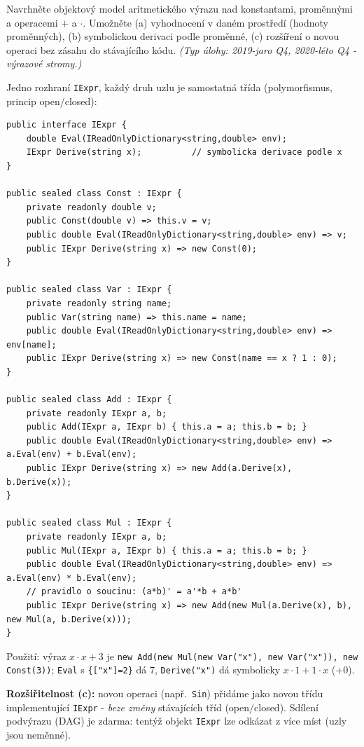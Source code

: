 \begin{zadani}
Navrhněte objektový model aritmetického výrazu nad konstantami, proměnnými a operacemi $+$ a $\cdot$. Umožněte (a) vyhodnocení v daném prostředí (hodnoty proměnných), (b) symbolickou derivaci podle proměnné, (c) rozšíření o novou operaci bez zásahu do stávajícího kódu. \emph{(Typ úlohy: 2019-jaro Q4, 2020-léto Q4 - výrazové stromy.)}
\end{zadani}

\begin{reseni}
Jedno rozhraní \texttt{IExpr}, každý druh uzlu je samostatná třída (polymorfismus, princip open/closed):
\begin{lstlisting}
public interface IExpr {
    double Eval(IReadOnlyDictionary<string,double> env);
    IExpr Derive(string x);          // symbolicka derivace podle x
}

public sealed class Const : IExpr {
    private readonly double v;
    public Const(double v) => this.v = v;
    public double Eval(IReadOnlyDictionary<string,double> env) => v;
    public IExpr Derive(string x) => new Const(0);
}

public sealed class Var : IExpr {
    private readonly string name;
    public Var(string name) => this.name = name;
    public double Eval(IReadOnlyDictionary<string,double> env) => env[name];
    public IExpr Derive(string x) => new Const(name == x ? 1 : 0);
}

public sealed class Add : IExpr {
    private readonly IExpr a, b;
    public Add(IExpr a, IExpr b) { this.a = a; this.b = b; }
    public double Eval(IReadOnlyDictionary<string,double> env) => a.Eval(env) + b.Eval(env);
    public IExpr Derive(string x) => new Add(a.Derive(x), b.Derive(x));
}

public sealed class Mul : IExpr {
    private readonly IExpr a, b;
    public Mul(IExpr a, IExpr b) { this.a = a; this.b = b; }
    public double Eval(IReadOnlyDictionary<string,double> env) => a.Eval(env) * b.Eval(env);
    // pravidlo o soucinu: (a*b)' = a'*b + a*b'
    public IExpr Derive(string x) => new Add(new Mul(a.Derive(x), b), new Mul(a, b.Derive(x)));
}
\end{lstlisting}
Použití: výraz $x\cdot x + 3$ je \texttt{new Add(new Mul(new Var("x"), new Var("x")), new Const(3))}; \texttt{Eval} s \texttt{\{["x"]=2\}} dá $7$, \texttt{Derive("x")} dá symbolicky $x{\cdot}1+1{\cdot}x$ ($+0$).

\textbf{Rozšiřitelnost (c):} novou operaci (např.\ \texttt{Sin}) přidáme jako novou třídu implementující \texttt{IExpr} - \emph{beze změny} stávajících tříd (open/closed). Sdílení podvýrazu (DAG) je zdarma: tentýž objekt \texttt{IExpr} lze odkázat z více míst (uzly jsou neměnné).
\end{reseni}

